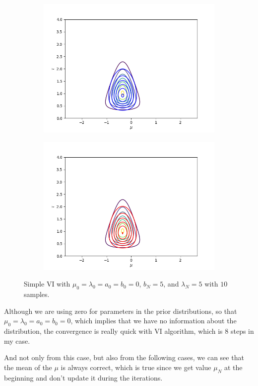 \documentclass[11pt]{extarticle}
\newcommand{\0}{\mathbf{0}}
\renewcommand{\(}{\left(}
\renewcommand{\)}{\right)}
\theoremstyle{definition}
\begin{document}
\begin{enumerate}
\begin{figure}[!ht]
\begin{subfigure}{.4\textwidth}
		\end{subfigure}
		\begin{subfigure}{.4\textwidth}
			\centering
			\includegraphics[width=\linewidth]{2_4_1_3}
		\end{subfigure}
		\begin{subfigure}{.4\textwidth}
			\centering
			\includegraphics[width=\linewidth]{2_4_1_8}
		\end{subfigure}
		\caption{Simple VI with $\mu_{0} = \lambda_{0} = a_{0} = b_{0} = 0$, $b_{N} = 5$, and $\lambda_{N} = 5$ with $10$ samples.}
		\label{fig:2_4_1}
	\end{figure}
	\par Although we are using zero for parameters in the prior distributions, so that $\mu_{0} = \lambda_{0} = a_{0} = b_{0} = 0$, which implies that we have no information about the distribution, the convergence is really quick with VI algorithm, which is $8$ steps in my case.
	\par And not only from this case, but also from the following cases, we can see that the mean of the $\mu$ is always correct, which is true since we get value $\mu_{N}$ at the beginning and don't update it during the iterations.


\end{enumerate}
\end{document}
